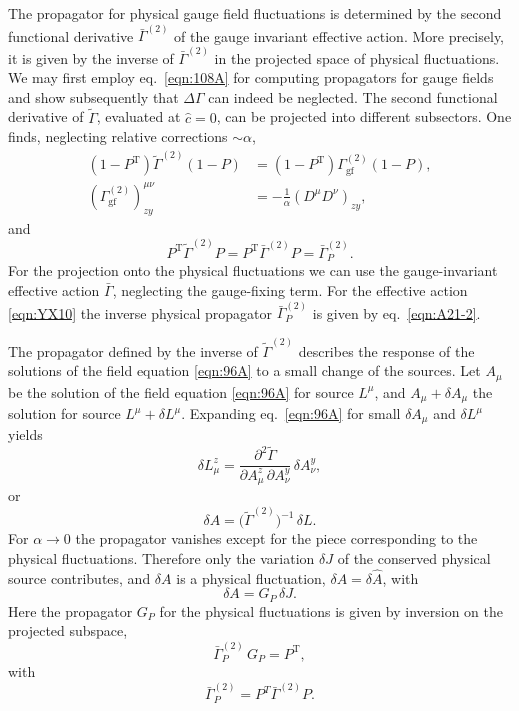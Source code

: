 \documentclass[twocolumn,aps,prd,amsmath,amssymb,preprintnumbers,longbibliography]{revtex4-1}
\numberwithin{equation}{section}
\newcommand{\transp}{\mathrm{T}}
\newenvironment{alignedeqn}{\begin{equation}\begin{aligned}}{\end{aligned}\end{equation}\ignorespacesafterend}
\begin{document}
The propagator for physical gauge field fluctuations is determined by the second functional derivative $\bar{\Gamma}^{(2)}$ of the gauge invariant effective action. More precisely, it is given by the inverse of $\bar{\Gamma}^{(2)}$ in the projected space of physical fluctuations. We may first employ eq.~\eqref{eqn:108A} for computing propagators for gauge fields and show subsequently that $\Delta\Gamma$ can indeed be neglected. The second functional derivative of $\tilde\Gamma$, evaluated at $\hat{c} = 0$, can be projected into different subsectors. One finds, neglecting relative corrections $\sim \alpha$,
\begin{alignedeqn}\label{eqn:347B}
	(1 - P^\transp) \tilde\Gamma^{(2)} (1 - P)
	&= (1 - P^\transp) \Gamma^{(2)}_\text{gf} (1 - P),\\
	(\Gamma^{(2)}_\text{gf})^{\mu\nu}_{zy}
	&= -\frac{1}{\alpha} (D^\mu D^\nu)_{zy},
\end{alignedeqn}
and
\begin{equation}\label{eqn:347C}
	P^\transp \tilde\Gamma^{(2)} P
	= P^\transp \bar\Gamma^{(2)} P
	= \bar{\Gamma}^{(2)}_P.
\end{equation}
For the projection onto the physical fluctuations we can use the gauge-invariant effective action $\bar\Gamma$, neglecting the gauge-fixing term. For the effective action \eqref{eqn:YX10} the inverse physical propagator $\bar{\Gamma}^{(2)}_P$ is given by eq.~\eqref{eqn:A21-2}.

The propagator defined by the inverse of $\tilde{\Gamma}^{(2)}$ describes the response of the solutions of the field equation \eqref{eqn:96A} to a small change of the sources. Let $A_\mu$ be the solution of the field equation \eqref{eqn:96A} for source $L^\mu$, and $A_\mu + \delta A_\mu$ the solution for source $L^\mu + \delta L^\mu$. Expanding eq.~\eqref{eqn:96A} for small $\delta A_\mu$ and $\delta L^\mu$ yields
\begin{equation}\label{eqn:CF1}
	\delta L_\mu^z
	= \frac{\partial^2 \tilde\Gamma}{\partial A_\mu^z \, \partial A_\nu^y} \, \delta A_\nu^y,
\end{equation}
or
\begin{equation}\label{eqn:CF2}
	\delta A
	= \bigl(\tilde\Gamma^{(2)}\bigr)^{-1} \, \delta L.
\end{equation}
For $\alpha \to 0$ the propagator vanishes except for the piece corresponding to the physical fluctuations. Therefore only the variation $\delta J$ of the conserved physical source contributes, and $\delta A$ is a physical fluctuation, $\delta A = \delta \hat{A}$, with
\begin{equation}\label{eqn:CF3}
	\delta A
	= G_P \, \delta J.
\end{equation}
Here the propagator $G_{P}$ for the physical fluctuations is given by inversion on the projected subspace,
\begin{equation}\label{eqn:CF4}
	\bar\Gamma_P^{(2)} \, G_P
	= P^\transp,
\end{equation}
with
\begin{equation}\label{eq:AS:129A} 
\bar{\Gamma}_{P}^{(2)}=P^{T}\bar{\Gamma}^{(2)}P.
\end{equation}
\end{document}
